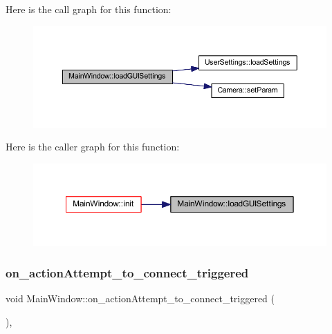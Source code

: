 Here is the call graph for this function\+:
\nopagebreak
\begin{figure}[H]
\begin{center}
\leavevmode
\includegraphics[width=350pt]{class_main_window_ad0f8d1384a86ac65b996addd300ef620_cgraph}
\end{center}
\end{figure}
Here is the caller graph for this function\+:
\nopagebreak
\begin{figure}[H]
\begin{center}
\leavevmode
\includegraphics[width=350pt]{class_main_window_ad0f8d1384a86ac65b996addd300ef620_icgraph}
\end{center}
\end{figure}
\mbox{\label{class_main_window_aea8024d64cc8d8b805b66a45524e753e}} 
\subsubsection{\texorpdfstring{on\_actionAttempt\_to\_connect\_triggered}{on\_actionAttempt\_to\_connect\_triggered}}
{\footnotesize\ttfamily void Main\+Window\+::on\+\_\+action\+Attempt\+\_\+to\+\_\+connect\+\_\+triggered (\begin{DoxyParamCaption}{ }\end{DoxyParamCaption})\hspace{0.3cm}{\ttfamily [private]}, {\ttfamily [slot]}}



